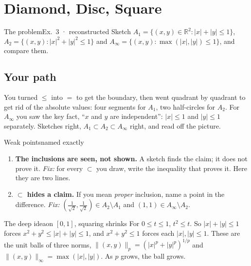 \documentclass{kaelearn}
\begin{document}
\section{Diamond, Disc, Square}

\begin{panel}[unbreakable]{The problem}{Ex.\ 3 · reconstructed}{}
Sketch $A_1=\{(x,y)\in\mathbb{R}^2: |x|+|y|\le1\}$, $A_2=\{(x,y): |x|^2+|y|^2\le1\}$ and
$A_\infty=\{(x,y): \max(|x|,|y|)\le1\}$, and compare them.
\end{panel}

\subsection{Your path}
You turned $\le$ into $=$ to get the boundary, then went quadrant by quadrant to get rid of the absolute values:
four segments for $A_1$, two half-circles for $A_2$. For $A_\infty$ you saw the key fact, ``$x$ and $y$ are
independent'': $|x|\le1$ and $|y|\le1$ separately. Sketches right, $A_1\subset A_2\subset A_\infty$ right, and read off
the picture.

\begin{panel}[unbreakable]{Weak points}{named exactly}{}
\begin{enumerate}
  \item \textbf{The inclusions are seen, not shown.} A sketch finds the claim; it does not prove it. \emph{Fix:} for
        every $\subset$ you draw, write the inequality that proves it. Here they are two lines.
  \item \textbf{$\subset$ hides a claim.} If you mean \emph{proper} inclusion, name a point in the difference.
        \emph{Fix:} $(\frac{1}{\sqrt2},\frac{1}{\sqrt2})\in A_2\setminus A_1$ and $(1,1)\in A_\infty\setminus A_2$.
\end{enumerate}
\end{panel}

\begin{panel}[unbreakable]{The deep idea}{on $[0,1]$, squaring shrinks}{}
For $0\le t\le1$, $t^2\le t$. So $|x|+|y|\le1$ forces $x^2+y^2\le|x|+|y|\le1$, and $x^2+y^2\le1$ forces each
$|x|,|y|\le1$. These are the unit balls  of three norms, $\|(x,y)\|_p=(|x|^p+|y|^p)^{1/p}$
and $\|(x,y)\|_\infty=\max(|x|,|y|)$. As $p$ grows, the ball grows.
\end{panel}
\end{document}
